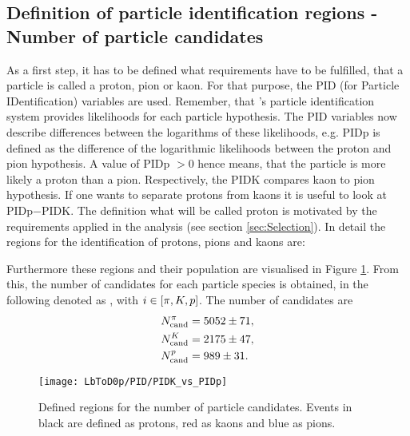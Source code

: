 \subsection{Definition of particle identification regions - Number of particle candidates}
\label{sec:PIDCalib_Ncand}
As a first step, it has to be defined what requirements have to be fulfilled, that a particle is called a proton, pion or kaon.
For that purpose, the PID (for Particle IDentification) variables are used.
Remember, that \lhcb's particle identification system provides likelihoods for each particle hypothesis.
The PID variables now describe differences between the logarithms of these likelihoods, e.g. PIDp is defined as the difference of the logarithmic likelihoods between the proton and pion hypothesis.
A value of PIDp $>0$ hence means, that the particle is more likely a proton than a pion.
Respectively, the PIDK compares kaon to pion hypothesis.
If one wants to separate protons from kaons it is useful to look at PIDp$-$PIDK.
The definition what will be called proton is motivated by the requirements applied in the analysis (see section \ref{sec:Selection}). 
In detail the regions for the identification of protons, pions and kaons are:


Furthermore these regions and their population are visualised in Figure \ref{fig:PIDregions}. 
From this, the number of candidates for each particle species is obtained, in the following denoted as , with $i \in \left[\pi, {K}, {p}\right]$. 
The number of candidates are
\begin{align}
    N_{\text{cand}}^{\pi}     &= 5052 \pm 71, \\ 
    N_{\text{cand}}^{{K}}   &= 2175 \pm 47, \\ 
    N_{\text{cand}}^{{p}} &= 989 \pm 31.
\end{align}
\begin{figure}[tb]
	\centering
	\texttt{[image: LbToD0p/PID/PIDK\_vs\_PIDp]}
	\caption{Defined regions for the number of particle candidates.
             Events in black are defined as protons, red as kaons and blue as pions.}
	\label{fig:PIDregions}
\end{figure}

